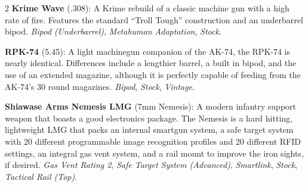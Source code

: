 \documentclass[
  oneside]{article}
\begin{document}
\begin{multicols}{2}
\textbf{Krime Wave} (.308): A Krime rebuild of a
classic machine gun with a high rate of fire.
Features the standard ``Troll Tough'' construction
and an underbarrel bipod. \emph{Bipod
(Underbarrel)}, \emph{Metahuman Adaptation},
\emph{Stock}.

\textbf{RPK-74} (5.45): A light machinegun
companion of the AK-74, the RPK-74 is nearly
identical. Differences include a lengthier barrel,
a built in bipod, and the use of an extended
magazine, although it is perfectly capable of
feeding from the AK-74's 30 round magazines.
\emph{Bipod}, \emph{Stock}, \emph{Vintage}.

\textbf{Shiawase Arms Nemesis LMG} (7mm Nemesis):
A modern infantry support weapon that boasts a
good electronics package. The Nemesis is a hard
hitting, lightweight LMG that packs an internal
smartgun system, a safe target system with 20
different programmable image recognition profiles
and 20 different RFID settings, an integral gas
vent system, and a rail mount to improve the iron
sights, if desired. \emph{Gas Vent Rating 2},
\emph{Safe Target System (Advanced)},
\emph{Smartlink}, \emph{Stock}, \emph{Tactical
Rail (Top)}.

\end{multicols}
\end{document}
